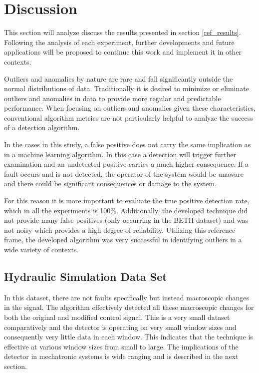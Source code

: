 \section{Discussion}
\label{sec:discussion}
This section will analyze discuss the results presented in section \ref{ref_results}. Following the analysis of each experiment, further developments and future applications will be proposed to continue this work and implement it in other contexts.

Outliers and anomalies by nature are rare and fall significantly outside the normal distributions of data. Traditionally it is desired to minimize or eliminate outliers and anomalies in data to provide more regular and predictable performance. When focusing on outliers and anomalies given these characteristics, conventional algorithm metrics are not particularly helpful to analyze the success of a detection algorithm.

In the cases in this study, a false positive does not carry the same implication as in a machine learning algorithm. In this case a detection will trigger further examination and an undetected positive carries a much higher consequence. If a fault occurs and is not detected, the operator of the system would be unaware and there could be significant consequences or damage to the system.

For this reason it is more important to evaluate the true positive detection rate, which in all the experiments is 100\%. Additionally, the developed technique did not provide many false positives (only occurring in the BETH dataset) and was not noisy which provides a high degree of reliability. Utilizing this reference frame, the developed algorithm was very successful in identifying outliers in a wide variety of contexts.

\subsection{Hydraulic Simulation Data Set}

In this dataset, there are not faults specifically but instead macroscopic changes in the signal. The algorithm effectively detected all these macroscopic changes for both the original and modified control signal. This is a very small dataset comparatively and the detector is operating on very small window sizes and consequently very little data in each window. This indicates that the technique is effective at various window sizes from small to large. The implications of the detector in mechatronic systems is wide ranging and is described in the next section.


